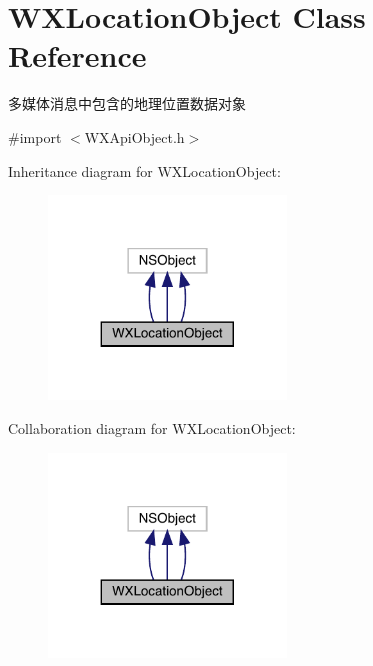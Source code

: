 \hypertarget{interface_w_x_location_object}{}\section{W\+X\+Location\+Object Class Reference}
\label{interface_w_x_location_object}


多媒体消息中包含的地理位置数据对象  




{\ttfamily \#import $<$W\+X\+Api\+Object.\+h$>$}



Inheritance diagram for W\+X\+Location\+Object\+:\nopagebreak
\begin{figure}[H]
\begin{center}
\leavevmode
\includegraphics[width=179pt]{interface_w_x_location_object__inherit__graph}
\end{center}
\end{figure}


Collaboration diagram for W\+X\+Location\+Object\+:\nopagebreak
\begin{figure}[H]
\begin{center}
\leavevmode
\includegraphics[width=179pt]{interface_w_x_location_object__coll__graph}
\end{center}
\end{figure}
